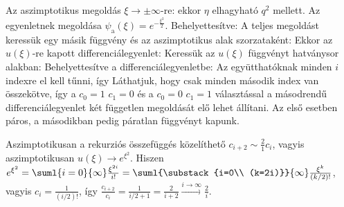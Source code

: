     Az aszimptotikus megoldás $\xi\to\pm\infty$-re: ekkor $\eta$ elhagyható $q^2$ mellett.
   Az egyenletnek megoldása $\psi_\text{a}(\xi)=e^{-\frac{\xi^2}{2}}$.
   Behelyettesítve:
    A teljes megoldást keressük egy másik függvény és az aszimptotikus alak szorzataként:
    Ekkor az $u(\xi)$-re kapott differenciálegyenlet:
    Keressük az $u(\xi)$ függvényt hatványsor alakban:
    Behelyettesítve a differenciálegyenletbe:
    Az együtthatóknak minden $i$ indexre el kell tűnni, így
    Láthatjuk, hogy csak minden második index van összekötve, így a $c_0=1$ $c_1=0$ és a $c_0=0$ $c_1=1$ választással a másodrendű differenciálegyenlet két független megoldását elő lehet állítani.
   Az első esetben páros, a másodikban pedig páratlan függvényt kapunk. 
    
    Aszimptotikusan a rekurziós összefüggés közelíthető $c_{i+2}\sim\frac{2}{1}c_i$, vagyis aszimptotikusan $u(\xi)\to e^{\xi^2}$.
   Hiszen $e^{\xi^2}=\suml{i=0}{\infty}\frac{\xi^{2i}}{i!}=\suml{\substack{i=0\\ (k=2i)}}{\infty}\frac{\xi^{k}}{(k/2)!}$, vagyis $c_i=\frac{1}{(i/2)!}$, így $\frac{c_{i+2}}{c_i}=\frac{1}{i/2+1}=\frac{2}{i+2}\xrightarrow{i\to\infty}\frac{2}{i}$.
    
